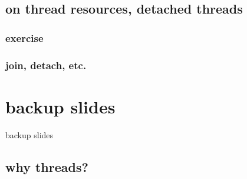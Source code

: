 \subsection{on thread resources, detached threads}

\subsubsection{exercise}


\subsubsection{join, detach, etc.}





\section{backup slides}
\begin{frame}{backup slides}
\end{frame}
\subsection{why threads?}




